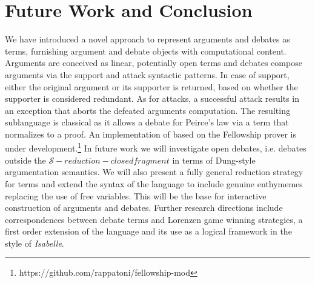 \documentclass{IOS-Book-Article}
\begin{document}
\section{Future Work and Conclusion}\label{sec:future-work-concl}

We have introduced a novel approach to represent arguments and debates as \matilda terms, furnishing argument and debate objects with computational content.
Arguments are conceived as linear, potentially open \matilda terms and debates compose arguments via the support and attack syntactic patterns.
In case of support, either the original argument or its supporter is returned, based on whether the supporter is considered redundant.
As for attacks, a successful attack results in an exception that aborts the defeated arguments computation.
The resulting \ACDC sublanguage is classical as it allows a debate for Peirce's law via a term that normalizes to a \matilda proof.
An implementation of \ACDC based on the Fellowship prover \cite{Kirchner2007InteroperableProofSystems} is under development.\footnote{https://github.com/rappatoni/fellowship-mod}
In future work we will investigate open debates, i.e. debates outside the $\mathcal{S}-reduction-closed fragment$ in terms of Dung-style argumentation semantics.
We will also present a fully general reduction strategy for \ACDC terms and extend the syntax of the language to include genuine enthymemes replacing the use of free variables.
This will be the base for interactive construction of arguments and debates. 
Further research directions include correspondences between \ACDC debate terms and Lorenzen game winning strategies, a first order extension of the language and its use as a logical framework in the style of \emph{Isabelle}.



\end{document}
